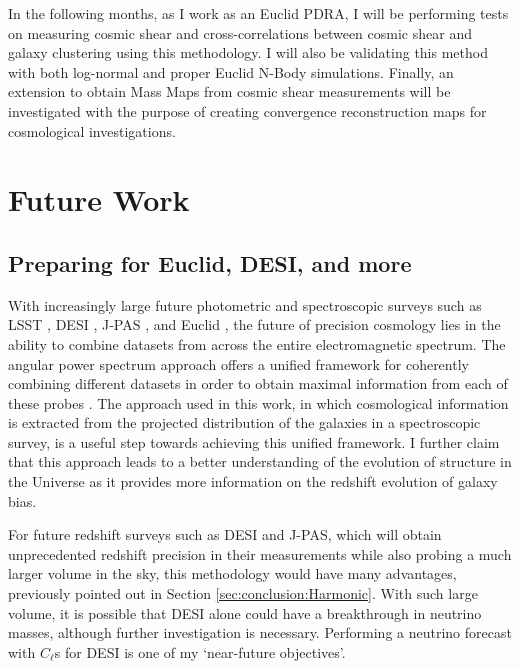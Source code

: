 \qquad In the following months, as I work as an Euclid PDRA, I will be performing tests on measuring cosmic shear and cross-correlations between cosmic shear and galaxy clustering using this methodology. I will also be validating this method with both log-normal and proper Euclid N-Body simulations. Finally, an extension to obtain Mass Maps from cosmic shear measurements will be investigated with the purpose of creating convergence reconstruction maps for cosmological investigations.

\section{Future Work} 
\subsection{Preparing for Euclid, DESI, and more}
\label{sec:conclusion:future}
With increasingly large future photometric and spectroscopic surveys such as LSST \citep{2012arXiv1211.0310L}, DESI \citep{2016-DESI}, J-PAS \citep{JPAS}, and Euclid \citep{2011EuclidRedPaper}, the future of precision cosmology lies in the ability to combine datasets from across the entire electromagnetic spectrum. The angular power spectrum approach offers a unified framework for coherently combining different datasets in order to obtain maximal information from each of these probes \citep{JoachimiBridle2010,Kirk2015,2016McLeod}. The approach used in this work, in which cosmological information is extracted from the projected distribution of the galaxies in a spectroscopic survey, is a useful step towards achieving this unified framework. I further claim that this approach leads to a better understanding of the evolution of structure in the Universe as it provides more information on the redshift evolution of galaxy bias.

\qquad For future redshift surveys such as DESI and J-PAS, which will obtain unprecedented redshift precision in their measurements while also probing a much larger volume in the sky, this methodology would have many advantages, previously pointed out in Section \ref{sec:conclusion:Harmonic}. With such large volume, it is possible that DESI alone could have a breakthrough in neutrino masses, although further investigation is necessary. Performing a neutrino forecast with $C_{\ell}$s for DESI is one of my `near-future objectives'.

